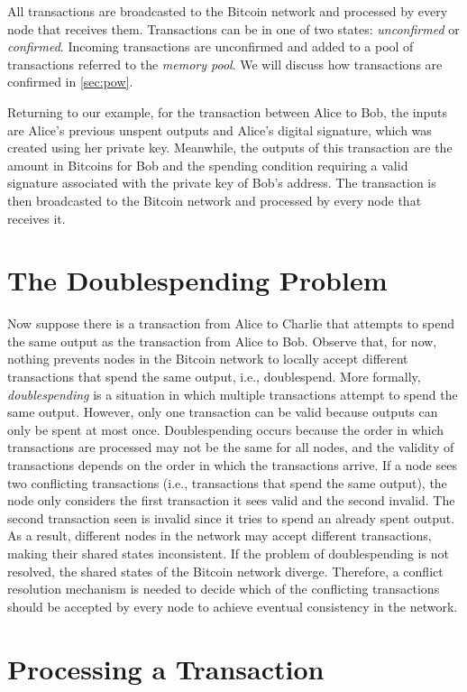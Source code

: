 \documentclass{article}
\begin{document}
All transactions are broadcasted to the Bitcoin network and processed by every
node that receives them. Transactions can be in one of two states:
\emph{unconfirmed} or \emph{confirmed}. Incoming transactions are unconfirmed
and added to a pool of transactions referred to the \emph{memory pool}. We will
discuss how transactions are confirmed in \cref{sec:pow}.

Returning to our example, for the transaction between Alice to Bob, the inputs
are Alice's previous unspent outputs and Alice's digital signature, which was
created using her private key. Meanwhile, the outputs of this transaction are
the amount in Bitcoins for Bob and the spending condition requiring a valid
signature associated with the private key of Bob's address. The transaction is
then broadcasted to the Bitcoin network and processed by every node that
receives it.

\section{The Doublespending Problem}

Now suppose there is a transaction from Alice to Charlie that attempts to spend
the same output as the transaction from Alice to Bob. Observe that, for now,
nothing prevents nodes in the Bitcoin network to locally accept different
transactions that spend the same output, i.e., doublespend. More formally,
\emph{doublespending} is a situation in which multiple transactions attempt to
spend the same output. However, only one transaction can be valid because
outputs can only be spent at most once. Doublespending occurs because the order
in which transactions are processed may not be the same for all nodes, and the
validity of transactions depends on the order in which the transactions arrive.
If a node sees two conflicting transactions (i.e., transactions that spend the
same output), the node only considers the first transaction it sees valid and
the second invalid. The second transaction seen is invalid since it tries to
spend an already spent output. As a result, different nodes in the network may
accept different transactions, making their shared states inconsistent. If the
problem of doublespending is not resolved, the shared states of the Bitcoin
network diverge. Therefore, a conflict resolution mechanism is needed to decide
which of the conflicting transactions should be accepted by every node to
achieve eventual consistency in the network.

\section{Processing a Transaction}
\end{document}
